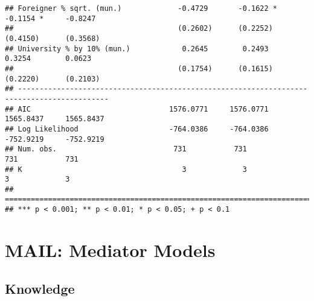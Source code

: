 \documentclass[
]{article}
\begin{document}
\begin{verbatim}
## Foreigner % sqrt. (mun.)             -0.4729       -0.1622 *      -0.1154 *     -0.8247    
##                                      (0.2602)      (0.2252)       (0.4150)      (0.3568)   
## University % by 10% (mun.)            0.2645        0.2493         0.3254        0.0623    
##                                      (0.1754)      (0.1615)       (0.2220)      (0.2103)   
## -------------------------------------------------------------------------------------------
## AIC                                1576.0771     1576.0771      1565.8437     1565.8437    
## Log Likelihood                     -764.0386     -764.0386      -752.9219     -752.9219    
## Num. obs.                           731           731            731           731         
## K                                     3             3              3             3         
## ===========================================================================================
## *** p < 0.001; ** p < 0.01; * p < 0.05; + p < 0.1
\end{verbatim}

\hypertarget{mail-mediator-models}{%
\section{MAIL: Mediator Models}\label{mail-mediator-models}}

\hypertarget{knowledge-1}{%
\subsection{Knowledge}\label{knowledge-1}}
\end{document}
